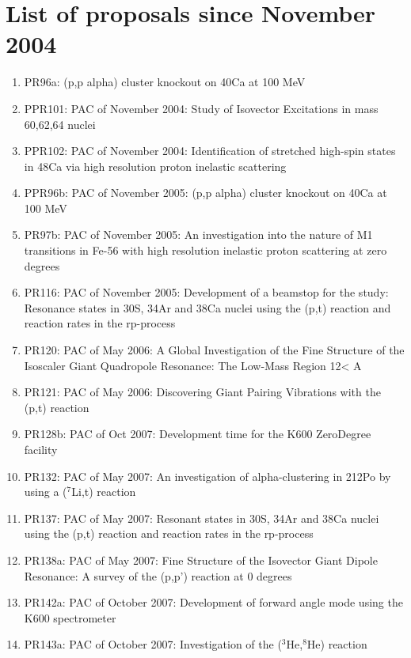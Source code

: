 \documentclass[11pt]{report}
\begin{document}


\chapter{List of proposals since November 2004}

\begin{enumerate}
\item PR96a: (p,p alpha) cluster knockout on 40Ca at 100 MeV 
\item PPR101: PAC of November 2004:    Study of Isovector Excitations in mass 60,62,64 nuclei 
\item PPR102: PAC of November 2004:    Identification of stretched high-spin states in 48Ca via high resolution proton inelastic scattering 
\item PPR96b: PAC of November 2005:    (p,p alpha) cluster knockout on 40Ca at 100 MeV 
\item PR97b: PAC of November 2005:    An investigation into the nature of M1 transitions in Fe-56 with high resolution inelastic proton scattering at zero degrees 
\item PR116: PAC of November 2005:    Development of a beamstop for the study: Resonance states in 30S, 34Ar and 38Ca nuclei using the (p,t) reaction and reaction rates in the rp-process 
\item PR120: PAC of May 2006:     A Global Investigation of the Fine Structure of the Isoscaler Giant Quadropole Resonance: The Low-Mass Region 12< A 
\item PR121: PAC of May 2006:     Discovering Giant Pairing Vibrations with the (p,t) reaction 
\item PR128b: PAC of Oct 2007:   Development time for the K600 ZeroDegree facility 
\item PR132: PAC of May 2007:    An investigation of alpha-clustering in 212Po by using a ($^7$Li,t) reaction 
\item PR137: PAC of May 2007:    Resonant states in 30S, 34Ar and 38Ca nuclei using the (p,t) reaction and reaction rates in the rp-process 
\item PR138a: PAC of May 2007:   Fine Structure of the Isovector Giant Dipole Resonance: A survey of the (p,p') reaction at 0 degrees 
\item PR142a: PAC of October 2007:     Development of forward angle mode using the K600 spectrometer 
\item PR143a: PAC of October 2007:     Investigation of the ($^3$He,$^8$He) reaction 

\end{enumerate}
\end{document}
